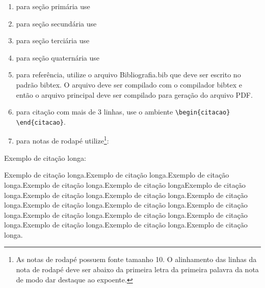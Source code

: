 \begin{enumerate}[label=\alph*)]
   \item para seção primária use \texttt{\detokenize{\chapter}}
   \item para seção secundária use \texttt{\detokenize{\section}}
   \item para seção terciária use \texttt{\detokenize{\subsection}}
   \item para seção quaternária use \texttt{\detokenize{\subsubsection}}
   \item para referência, utilize o arquivo Bibliografia.bib que deve ser escrito no padrão bibtex. O arquivo deve ser compilado com o compilador bibtex e então o arquivo principal deve ser compilado para geração do arquivo PDF.
\item para citação com mais de 3 linhas, use o ambiente \verb!\begin{citacao}! \verb!\end{citacao}!.
   \item para notas de rodapé utilize\footnote{As notas de rodapé possuem fonte tamanho 10. O alinhamento das linhas da nota de rodapé deve ser abaixo da primeira letra da primeira palavra da nota de modo dar destaque ao expoente.}: \texttt{\detokenize{\footnote}}
\end{enumerate}

Exemplo de citação longa: 

\begin{citacao}
Exemplo de citação longa.Exemplo de citação longa.Exemplo de citação longa.Exemplo de citação longa.Exemplo de citação longaExemplo de citação longa.Exemplo de citação longa.Exemplo de citação longa.Exemplo de citação longa.Exemplo de citação longa.Exemplo de citação longa.Exemplo de citação longa.Exemplo de citação longa.Exemplo de citação longa.Exemplo de citação longa.Exemplo de citação longa.Exemplo de citação longa.Exemplo de citação longa.
\end{citacao}

